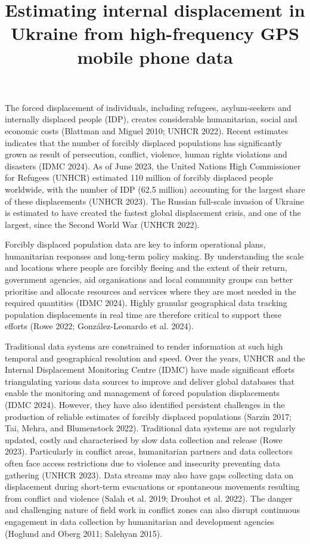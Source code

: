 \documentclass[
  sn-nature,
  11pt,
]{sn-jnl}
\title[\textbf{Estimating internal displacement in Ukraine from
high-frequency GPS mobile phone data}]{\textbf{Estimating internal
displacement in Ukraine from high-frequency GPS mobile phone data}}
\author[1]{\fnm{Rodgers} \sur{Iradukunda}}\author*[1]{\fnm{Francisco} \sur{Rowe}}\email{f.rowe-gonzalez@liverpool.ac.uk}\author[1]{\fnm{Elisabetta} \sur{Pietrostefani}}
\affil[1]{\orgdiv{Geographic Data Science Lab, Department of Geography
and Planning}, \orgname{University of Liverpool, Liverpool}}
\begin{document}
\maketitle


\newpage

The forced displacement of individuals, including refugees,
asylum-seekers and internally displaced people (IDP), creates
considerable humanitarian, social and economic costs (Blattman and
Miguel 2010; UNHCR 2022). Recent estimates indicates that the number of
forcibly displaced populations has significantly grown as result of
persecution, conflict, violence, human rights violations and disasters
(IDMC 2024). As of June 2023, the United Nations High Commissioner for
Refugees (UNHCR) estimated 110 million of forcibly displaced people
worldwide, with the number of IDP (62.5 million) accounting for the
largest share of these displacements (UNHCR 2023). The Russian
full-scale invasion of Ukraine is estimated to have created the fastest
global displacement crisis, and one of the largest, since the Second
World War (UNHCR 2022).

Forcibly displaced population data are key to inform operational plans,
humanitarian responses and long-term policy making. By understanding the
scale and locations where people are forcibly fleeing and the extent of
their return, government agencies, aid organisations and local community
groups can better prioritise and allocate resources and services where
they are most needed in the required quantities (IDMC 2024). Highly
granular geographical data tracking population displacements in real
time are therefore critical to support these efforts (Rowe 2022;
González-Leonardo et al. 2024).

Traditional data systems are constrained to render information at such
high temporal and geographical resolution and speed. Over the years,
UNHCR and the Internal Displacement Monitoring Centre (IDMC) have made
significant efforts triangulating various data sources to improve and
deliver global databases that enable the monitoring and management of
forced population displacements (IDMC 2024). However, they have also
identified persistent challenges in the production of reliable estimates
of forcibly displaced populations (Sarzin 2017; Tai, Mehra, and
Blumenstock 2022). Traditional data systems are not regularly updated,
costly and characterised by slow data collection and release (Rowe
2023). Particularly in conflict areas, humanitarian partners and data
collectors often face access restrictions due to violence and insecurity
preventing data gathering (UNHCR 2023). Data streams may also have gaps
collecting data on displacement during short-term evacuations or
spontaneous movements resulting from conflict and violence (Salah et al.
2019; Drouhot et al. 2022). The danger and challenging nature of field
work in conflict zones can also disrupt continuous engagement in data
collection by humanitarian and development agencies (Hoglund and Oberg
2011; Salehyan 2015).
\end{document}
